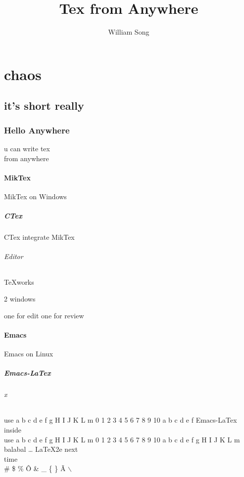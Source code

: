 \documentclass[a4paper,11pt]{book} %
\author{William Song}
\title{Tex from Anywhere}
\begin{document}

\tableofcontents

\mainmatter
\part{chaos}
\chapter[short]{it's short really}
	\section{Hello Anywhere} u can write tex\\ from anywhere
		\subsection{MikTex} MikTex on
Windows
			\subsubsection{CTex}CTex integrate MikTex
				\paragraph{Editor}TeXworks
					\subparagraph{2 windows}one for edit one for review
		\subsection{Emacs}Emacs on Linux
			\subsubsection{Emacs-LaTex}
\paragraph{x}
use a b c d e f g H I J K L m 0 1 2 3 4 5 6 7 8 9 10 a b c d e f  \linebreak[3] Emacs-LaTex inside
\\
use a b c d e f g H I J K L m 0 1 2 3 4 5 6 7 8 9 10 a b c d e f g H I J K L m \\
balabal \ldots{} %
\LaTeX2e
next \\%
time\\
\# \$ \% \^{O} \& \_ \{ \} \~{A}
$\backslash$
\end{document}
